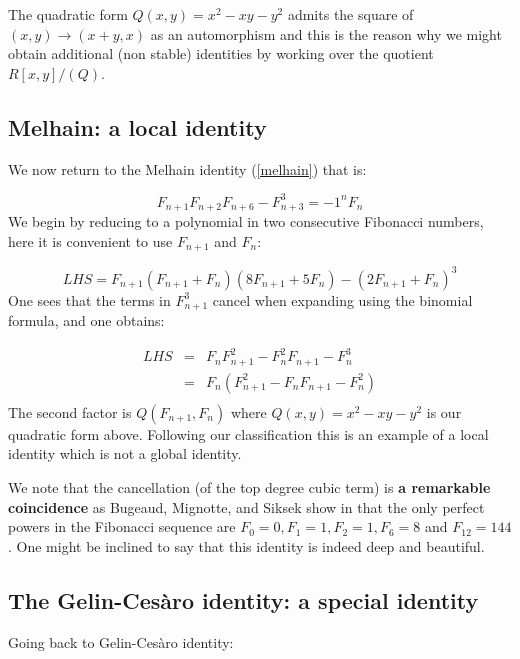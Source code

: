 \documentclass[12pt,a4paper]{amsart}
\begin{document}

The quadratic form 
$Q(x,y) = x^2 - x y - y^2$
admits the square of $(x,y) \to (x+y,x)$ as an automorphism and this is the reason why we might obtain additional (non stable) identities by  working over the quotient $R[x,y]/(Q)$.



\subsection{Melhain: a local identity}
\label{proof melhain}

We now return to the Melhain identity (\ref{melhain}) that is:

\begin{equation*}
	F_{n+1}F_{n+2}F_{n+6} - F_{n+3}^3 = {-1}^{n} F_n
	\label{melhain}
\end{equation*}
We begin by reducing to a polynomial in two consecutive Fibonacci
numbers, here it is convenient  to use $F_{n+1}$ and $F_n$:

$$LHS = F_{n+1}(F_{n+1} + F_n)(8F_{n+1} + 5F_n) - (2F_{n+1} + F_n)^3$$
One sees that the terms in $F_{n+1}^3$ cancel when
expanding using the binomial formula, and  one obtains:

\begin{eqnarray*}
	LHS &=& F_n F_{n+1}^2 - F_n^2 F_{n+1} - F_n^3\\
	 &=& F_n (F_{n+1}^2 - F_n F_{n+1} - F_n^2)\\
\end{eqnarray*}
The second factor is $Q(F_{n+1}, F_n)$ where $Q(x,y) = x^2 - x y -
y^2$ is our quadratic form above. Following our classification this is an example of a local identity which is not a global identity.

We note that the cancellation (of the top degree cubic term) is
\textbf{a remarkable coincidence} as   Bugeaud,  Mignotte, and Siksek
 show in \cite{powers} that the only perfect powers in the
Fibonacci sequence are $F_0 = 0, F_1 = 1, F_2 = 1, F_6 = 8$ and
$F_{12} = 144$.  One might be inclined to say that this identity is indeed deep and beautiful.

\subsection{The Gelin-Cesàro identity: a special identity}
\label{proof gelin}
Going back to Gelin-Cesàro identity:
\end{document}
